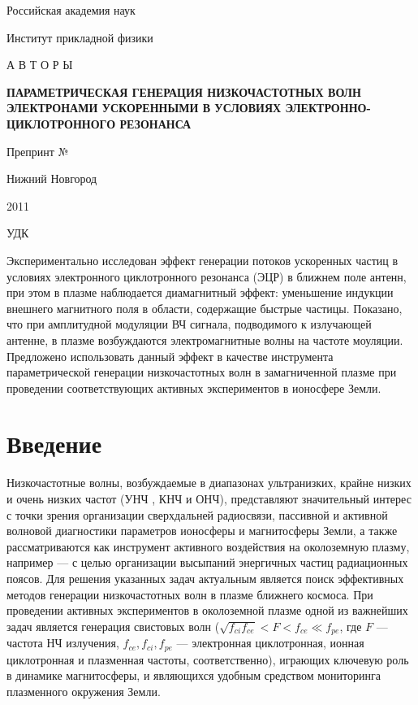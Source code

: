 \documentclass[autoref,10pt]{disser}
\begin{document}
\Russian
\thispagestyle{empty}
\vspace{1.5cm}
\centerline{Российская академия наук}
\centerline{Институт прикладной физики}
\vspace{3cm}
\centerline{А В Т О Р Ы}
\vspace{0.8cm}
\begin{center}
\large 
\textbf{ПАРАМЕТРИЧЕСКАЯ ГЕНЕРАЦИЯ НИЗКОЧАСТОТНЫХ ВОЛН ЭЛЕКТРОНАМИ УСКОРЕННЫМИ В УСЛОВИЯХ ЭЛЕКТРОННО-ЦИКЛОТРОННОГО РЕЗОНАНСА}
\end{center}
\vspace{2cm}
\centerline{\large Препринт № }
\vfill
\centerline{Нижний Новгород}
\centerline{2011}
\newpage
\thispagestyle{empty}
\begin{flushleft}
УДК
\end{flushleft}


Экспериментально исследован эффект генерации потоков ускоренных частиц в условиях электронного циклотронного резонанса (ЭЦР) в ближнем поле антенн, при этом в плазме наблюдается диамагнитный эффект: уменьшение индукции внешнего магнитного поля в области, содержащие быстрые частицы. Показано, что при амплитудной модуляции ВЧ сигнала, подводимого к излучающей антенне, в плазме возбуждаются электромагнитные волны на частоте моуляции. Предложено использовать данный эффект в качестве  инструмента параметрической генерации  низкочастотных волн в замагниченной плазме при проведении соответствующих активных экспериментов в ионосфере Земли. 

\newpage
\section{Введение}
Низкочастотные волны, возбуждаемые в диапазонах ультранизких, крайне низких и очень низких частот (УНЧ , КНЧ и ОНЧ), представляют значительный интерес с точки зрения организации сверхдальней радиосвязи, пассивной и активной волновой диагностики параметров ионосферы и магнитосферы Земли, а также рассматриваются как инструмент активного воздействия на околоземную плазму, например --- с целью организации высыпаний энергичных частиц радиационных поясов. Для решения указанных задач актуальным является поиск эффективных методов генерации низкочастотных волн в плазме ближнего космоса. 
При проведении активных экспериментов в околоземной плазме одной из важнейших задач является генерация свистовых волн ($\sqrt{f_{ci}f_{ce}}<F<f_{ce}\ll f_{pe}$, где $F$ --- частота НЧ излучения, $f_{ce}, f_{ci}, f_{pe}$ --- электронная циклотронная, ионная циклотронная и плазменная частоты, соответственно), играющих ключевую роль в динамике магнитосферы, и являющихся удобным средством мониторинга плазменного  окружения Земли. 
\end{document}
